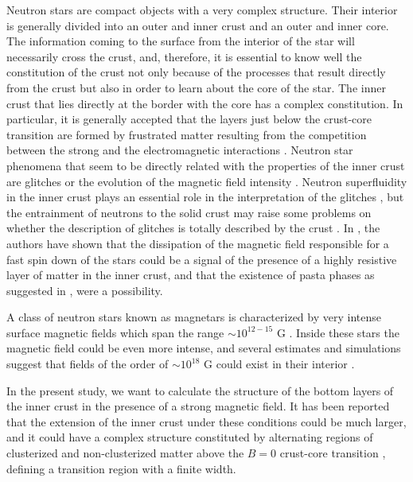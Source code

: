 \documentclass[epj]{svjour}
\begin{document}
Neutron stars are compact objects with a very complex structure. Their
interior is generally divided into an outer and  inner crust and an outer and
inner core. The information coming to the surface  from the interior of the star will
necessarily cross the crust, and, therefore, it is essential to know
well the constitution of the crust not only because of the processes
that  result directly from the crust but also in order to learn about
the core of the star.
The inner crust that lies directly at the border with the core  has a
complex constitution. In particular, it is generally accepted that  the layers just below the
crust-core transition are formed by frustrated matter  resulting from the
competition between  the 
strong and the electromagnetic interactions \cite{Ravenhall-83,Hashimoto-84,Horowitz-05,watanabe2005,Maruyama2005,Avancini-08,Avancini-10,pais2012PRL,Bao-14}.  Neutron star phenomena
that seem to be directly related with the properties of the inner
crust are glitches \cite{Link-99,Chamel-13,Andersson-12} or the evolution of
the magnetic field intensity  \cite{Pons-13}.
Neutron superfluidity in the inner crust plays an essential role
in the interpretation of the glitches \cite{Link-99}, but the
entrainment of neutrons to the solid crust may raise some problems on
whether the description of glitches is totally described by the crust
\cite{Chamel-13,Andersson-12}. In \cite{Pons-13}, the authors have shown that
the  dissipation of the magnetic field responsible for a fast spin
down of the stars could be a signal of the presence of a highly
resistive layer of matter in the inner crust, and that the existence of pasta phases as
suggested in \cite{Ravenhall-83}, were a possibility.

A class of  neutron stars known as magnetars is characterized by very
intense surface magnetic  fields which span the range $\sim
10^{12-15}$ G \cite{kaspi14,pulsars}. Inside these stars the magnetic field could be even more
intense, and several estimates and simulations suggest that fields  of
the order of  $\sim 10^{18}$ G  could exist in their interior \cite{lai1991cold,cardall2001effects,Broderick02,Chatterjee15,Gomes19,Sengo20}.


In the present study, we want to calculate the structure of the bottom
layers of the inner crust in the presence of a strong magnetic
field. It has been reported that the extension of the inner crust under
these conditions could be much larger, and it could have a complex structure
constituted by alternating regions of clusterized and non-clusterized
matter above the $B=0$ crust-core transition \cite{Fang16,Fang17,Chen17,Fang17a},
defining a transition region with a finite width. 
\end{document}
